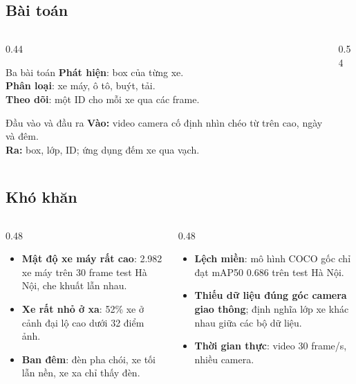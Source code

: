 \documentclass[aspectratio=\mlwAspectRatio, \mlwBaseSize, t]{beamer}
\begin{document}
\subsection{Bài toán}
\begin{frame}{\stitle}
  \begin{columns}[T]
    \begin{column}{0.44\textwidth}
      \begin{block}{Ba bài toán}
        \textbf{Phát hiện}: box của từng xe.\\
        \textbf{Phân loại}: xe máy, ô tô, buýt, tải.\\
        \textbf{Theo dõi}: một ID cho mỗi xe qua các frame.
      \end{block}
      \begin{block}{Đầu vào và đầu ra}
        \textbf{Vào:} video camera cố định nhìn chéo từ trên cao, ngày và đêm.\\
        \textbf{Ra:} box, lớp, ID; ứng dụng đếm xe qua vạch.
      \end{block}
    \end{column}
    \begin{column}{0.54\textwidth}
      \centering
    \end{column}
  \end{columns}
\end{frame}

\subsection{Khó khăn}
\begin{frame}{\stitle}
  \begin{columns}[T]
    \begin{column}{0.48\textwidth}
      \begin{itemize}
        \item \textbf{Mật độ xe máy rất cao}: 2.982 xe máy trên 30 frame test Hà Nội, che khuất lẫn nhau.
        \item \textbf{Xe rất nhỏ ở xa}: 52\% xe ở cảnh đại lộ cao dưới 32 điểm ảnh.
        \item \textbf{Ban đêm}: đèn pha chói, xe tối lẫn nền, xe xa chỉ thấy đèn.
      \end{itemize}
    \end{column}
    \begin{column}{0.48\textwidth}
      \begin{itemize}
        \item \textbf{Lệch miền}: mô hình COCO gốc chỉ đạt mAP50 0.686 trên test Hà Nội.
        \item \textbf{Thiếu dữ liệu đúng góc camera giao thông}; định nghĩa lớp xe khác nhau giữa các bộ dữ liệu.
        \item \textbf{Thời gian thực}: video 30 frame/s, nhiều camera.
      \end{itemize}
    \end{column}
  \end{columns}
\end{frame}
\end{document}
